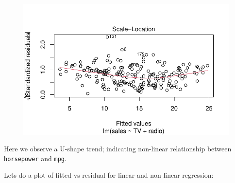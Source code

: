 \documentclass[
  letterpaper,
  DIV=11,
  numbers=noendperiod]{scrreprt}
\begin{document}
\begin{figure}[H]

{\centering \includegraphics{Chapter3_files/figure-pdf/unnamed-chunk-97-1.pdf}

}

\end{figure}

Here we observe a U-shape trend; indicating non-linear relationship
between \texttt{horsepower} and \texttt{mpg}.

Lets do a plot of fitted vs residual for linear and non linear
regression:
\end{document}
